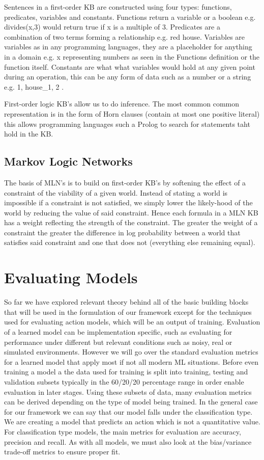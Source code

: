 Sentences in a first-order KB are constructed using four types: functions, predicates, variables and constants. Functions return a variable or a boolean e.g. divides(x,3) would return true if x is a multiple of 3. Predicates are a combination of two terms forming a relationship e.g. red house. Variables are variables as in any programming languages, they are a  placeholder for anything in a domain e.g. x representing numbers as seen in the Functions definition or the function itself. Constants are what what variables would hold at any given point during an operation, this can be any form of data such as a number or a string e.g. 1, house_1, 2 . 

First-order logic KB's allow us to do inference. The most common common representation is in the form of Horn clauses (contain at most one positive literal) this allows programming languages such a Prolog to search for statements taht hold in the KB.

\subsection{Markov Logic Networks}
The basis of MLN's is to build on first-order KB's by softening the effect of a constraint of the viability of a given world. Instead of stating a world is impossible if a constraint is not satisfied, we simply lower the likely-hood of the world by reducing the value of said constraint. Hence each formula in a MLN KB has a weight reflecting the strength of the constraint. The greater the weight of a constraint the greater the difference in log probability between a world that satisfies said constraint and one that does not (everything else remaining equal). 
\newpage
\section{Evaluating Models}
So far we have explored relevant theory behind all of the basic building blocks that will be used in the formulation of our framework except for the techniques used for evaluating action models, which will be an output of training. Evaluation of a learned model can be implementation specific, such as evaluating for performance under different but relevant conditions such as noisy, real or simulated environments. However we will go over the standard evaluation metrics for a learned model that apply most if not all modern ML situations. Before even training a model a the data used for training is split into training, testing and validation subsets typically in the 60/20/20 percentage range in order enable evaluation in later stages. Using these subsets of data, many evaluation metrics can be derived depending on the type of model being trained. In the general case for our framework we can say that our model falls under the classification type. We are creating a model that predicts an action which is not a quantitative value. For classification type models, the main metrics for evaluation are accuracy, precision and recall. As with all models, we must also look at the bias/variance trade-off metrics to ensure proper fit.

